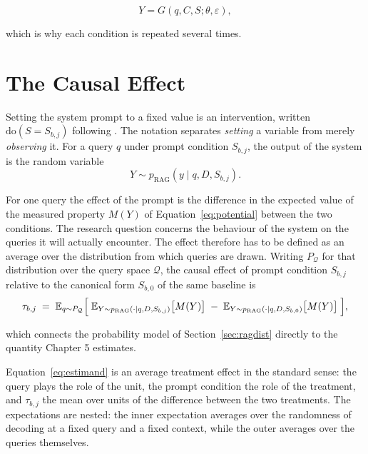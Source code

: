 \documentclass[12pt,a4paper,oneside]{scrreprt}
\begin{document}
\begin{equation}
\label{eq:noise}
Y = G(q,C,S;\theta,\varepsilon),
\end{equation}

which is why each condition is repeated several times.

\section{The Causal Effect}

Setting the system prompt to a fixed value is an intervention, written $\mathrm{do}(S = S_{b,j})$ following \citet{pearl2009causality}. The notation separates \textit{setting} a variable from merely \textit{observing} it. For a query $q$ under prompt condition $S_{b,j}$, the output of the system is the random variable
\begin{equation}
\label{eq:potential}
Y \sim p_{\mathrm{RAG}}(y \mid q,D,S_{b,j}).
\end{equation}

For one query the effect of the prompt is the difference in the expected value of the measured property $M(Y)$ of Equation~\eqref{eq:potential} between the two conditions. The research question concerns the behaviour of the system on the queries it will actually encounter. The effect therefore has to be defined as an average over the distribution from which queries are drawn. Writing $P_{\mathcal{Q}}$ for that distribution over the query space $\mathcal{Q}$, the causal effect of prompt condition $S_{b,j}$ relative to the canonical form $S_{b,0}$ of the same baseline is
\begin{equation}
\label{eq:estimand}
\tau_{b,j} \;=\; \mathbb{E}_{q \sim P_{\mathcal{Q}}}\Bigl[\; \mathbb{E}_{Y \sim p_{\mathrm{RAG}}(\cdot \mid q,D,S_{b,j})}\bigl[M(Y)\bigr] \;-\; \mathbb{E}_{Y \sim p_{\mathrm{RAG}}(\cdot \mid q,D,S_{b,0})}\bigl[M(Y)\bigr] \;\Bigr],
\end{equation}

which connects the probability model of Section~\ref{sec:ragdist} directly to the quantity Chapter 5 estimates. 

Equation~\eqref{eq:estimand} is an average treatment effect in the standard sense: the query plays the role of the unit, the prompt condition the role of the treatment, and $\tau_{b,j}$ the mean over units of the difference between the two treatments. The expectations are nested: the inner expectation averages over the randomness of decoding at a fixed query and a fixed context, while the outer averages over the queries themselves.
\end{document}
